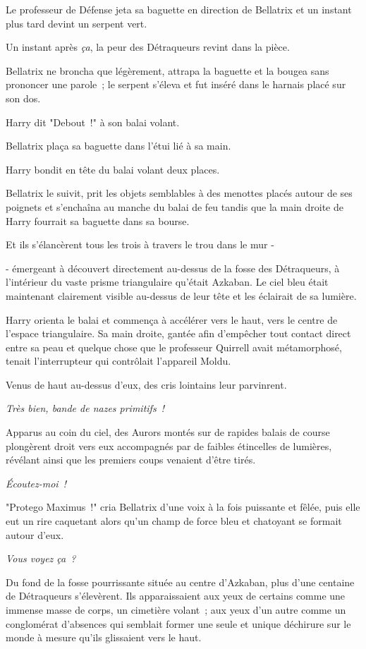 Le professeur de Défense jeta sa baguette en direction de Bellatrix et un instant plus tard devint un serpent vert.

Un instant après \emph{ça}, la peur des Détraqueurs revint dans la pièce.

Bellatrix ne broncha que légèrement, attrapa la baguette et la bougea sans prononcer une parole~; le serpent s'éleva et fut inséré dans le harnais placé sur son dos.

Harry dit "Debout~!" à son balai volant.

Bellatrix plaça sa baguette dans l'étui lié à sa main.

Harry bondit en tête du balai volant deux places.

Bellatrix le suivit, prit les objets semblables à des menottes placés autour de ses poignets et s'enchaîna au manche du balai de feu tandis que la main droite de Harry fourrait sa baguette dans sa bourse.

Et ils s'élancèrent tous les trois à travers le trou dans le mur -

- émergeant à découvert directement au-dessus de la fosse des Détraqueurs, à l'intérieur du vaste prisme triangulaire qu'était Azkaban. Le ciel bleu était maintenant clairement visible au-dessus de leur tête et les éclairait de sa lumière.

Harry orienta le balai et commença à accélérer vers le haut, vers le centre de l'espace triangulaire. Sa main droite, gantée afin d'empêcher tout contact direct entre sa peau et quelque chose que le professeur Quirrell avait métamorphosé, tenait l'interrupteur qui contrôlait l'appareil Moldu.

Venus de haut au-dessus d'eux, des cris lointains leur parvinrent.

\emph{Très bien, bande de nazes primitifs~!}

Apparus au coin du ciel, des Aurors montés sur de rapides balais de course plongèrent droit vers eux accompagnés par de faibles étincelles de lumières, révélant ainsi que les premiers coups venaient d'être tirés.

\emph{Écoutez-moi~!}

"Protego Maximus~!" cria Bellatrix d'une voix à la fois puissante et fêlée, puis elle eut un rire caquetant alors qu'un champ de force bleu et chatoyant se formait autour d'eux.

\emph{Vous voyez ça~?}

Du fond de la fosse pourrissante située au centre d'Azkaban, plus d'une centaine de Détraqueurs s'élevèrent. Ils apparaissaient aux yeux de certains comme une immense masse de corps, un cimetière volant~; aux yeux d'un autre comme un conglomérat d'absences qui semblait former une seule et unique déchirure sur le monde à mesure qu'ils glissaient vers le haut.


